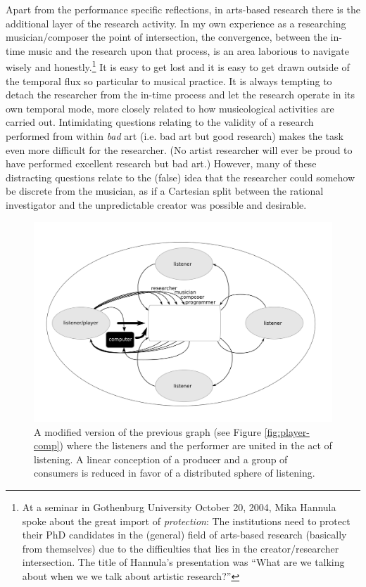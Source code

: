 Apart from the performance specific reflections, in arts-based research there is the additional layer of the research activity. In my own experience as a researching musician/composer the point of intersection, the convergence, between the in-time music and the research upon that process, is an area laborious to navigate wisely and honestly.\footnote{At a seminar in Gothenburg University October 20, 2004, Mika Hannula spoke about the great import of \emph{protection}: The institutions need to protect their PhD candidates in the (general) field of arts-based research (basically from themselves) due to the difficulties that lies in the creator/researcher intersection. The title of Hannula's presentation was ``What are we talking about when we we talk about artistic research?''} It is easy to get lost and it is easy to get drawn outside of the temporal flux so particular to musical practice. It is always tempting to detach the researcher from the in-time process and let the research operate in its own temporal mode, more closely related to how musicological activities are carried out. Intimidating questions relating to the validity of a research performed from within \emph{bad} art (i.e. bad art but good research) makes the task even more difficult for the researcher. (No artist researcher will ever be proud to have performed excellent research but bad art.) However, many of these distracting questions relate to the (false) idea that the researcher could somehow be discrete from the musician, as if a Cartesian split between the rational investigator and the unpredictable creator was possible and desirable. 

\begin{figure}[htb]
  \centering
  \includegraphics[width=\linewidth]{img/player-listener-computer}
  \caption{\small{A modified version of the previous graph (see Figure \ref{fig:player-comp}) where the listeners and the performer are united in the act of listening. A linear conception of a producer and a group of consumers is reduced in favor of a distributed sphere of listening.}}
  \label{fig:player-comp-2}
\end{figure}

